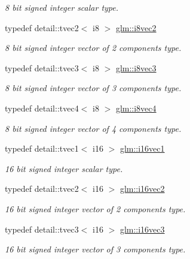 \begin{DoxyCompactItemize}
\begin{DoxyCompactList}\small\item\em 8 bit signed integer scalar type. \end{DoxyCompactList}\item 
typedef detail\-::tvec2$<$ i8 $>$ \hyperlink{group__gtc__type__precision_ga4d5ac02b48c4c6e1642ae89f9d3f3c7e}{glm\-::i8vec2}
\begin{DoxyCompactList}\small\item\em 8 bit signed integer vector of 2 components type. \end{DoxyCompactList}\item 
typedef detail\-::tvec3$<$ i8 $>$ \hyperlink{group__gtc__type__precision_gafd1d80c392c472fc14864ebd8c9316e9}{glm\-::i8vec3}
\begin{DoxyCompactList}\small\item\em 8 bit signed integer vector of 3 components type. \end{DoxyCompactList}\item 
typedef detail\-::tvec4$<$ i8 $>$ \hyperlink{group__gtc__type__precision_gad65f6cda14cdf79b2e8afe6ec8ab3725}{glm\-::i8vec4}
\begin{DoxyCompactList}\small\item\em 8 bit signed integer vector of 4 components type. \end{DoxyCompactList}\item 
typedef detail\-::tvec1$<$ i16 $>$ \hyperlink{group__gtc__type__precision_ga95c6d9b5d9d140fad7405496484ec622}{glm\-::i16vec1}
\begin{DoxyCompactList}\small\item\em 16 bit signed integer scalar type. \end{DoxyCompactList}\item 
typedef detail\-::tvec2$<$ i16 $>$ \hyperlink{group__gtc__type__precision_gae6b6e6aecc629c6ba90ab75d2a555cdd}{glm\-::i16vec2}
\begin{DoxyCompactList}\small\item\em 16 bit signed integer vector of 2 components type. \end{DoxyCompactList}\item 
typedef detail\-::tvec3$<$ i16 $>$ \hyperlink{group__gtc__type__precision_ga431a95adcef90192c0c0f1a6fc05ab4e}{glm\-::i16vec3}
\begin{DoxyCompactList}\small\item\em 16 bit signed integer vector of 3 components type. \end{DoxyCompactList}\item 

\end{DoxyCompactItemize}

